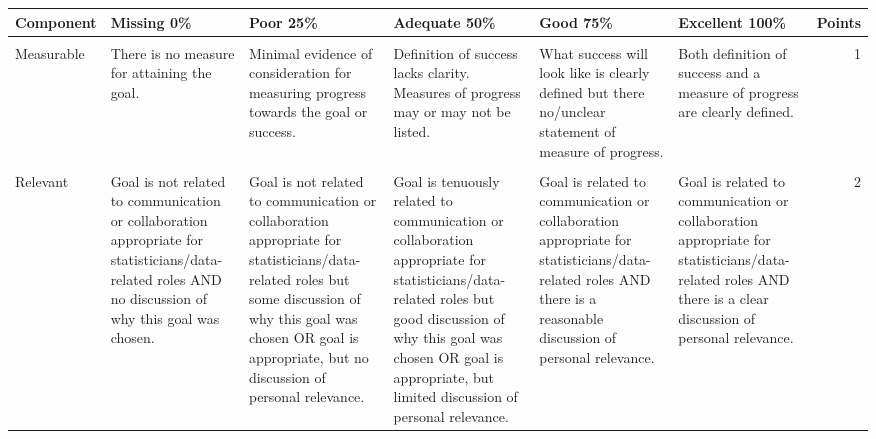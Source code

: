 \documentclass[
  openany]{book}
\begin{document}
\begin{table}
\centering\begingroup\fontsize{8}{10}\selectfont

\begin{tabular}{l>{\raggedright\arraybackslash}p{12em}>{\raggedright\arraybackslash}p{12em}>{\raggedright\arraybackslash}p{12em}>{\raggedright\arraybackslash}p{12em}>{\raggedright\arraybackslash}p{12em}r}
\toprule
Component & Missing 0\% & Poor 25\% & Adequate 50\% & Good 75\% & Excellent 100\% & Points\\
\midrule
\cellcolor{gray!6}{Specific} & \cellcolor{gray!6}{There is no goal stated.} & \cellcolor{gray!6}{Goal is too generic and poorly specified. } & \cellcolor{gray!6}{Goal is stated but it is not specific. At least one resource may or may not be listed.} & \cellcolor{gray!6}{Goal is specific but no/unclear resource is mentioned.} & \cellcolor{gray!6}{Goal is specific. At least one resource that will be used to help is mentioned.} & \cellcolor{gray!6}{1}\\
Measurable & There is no measure for attaining the goal. & Minimal evidence of consideration for measuring progress towards the goal or success. & Definition of success lacks clarity. Measures of progress may or may not be listed. & What success will look like is clearly defined but there no/unclear statement of measure of progress. & Both definition of success and a measure of progress are clearly defined. & 1\\
\cellcolor{gray!6}{Attainable} & \cellcolor{gray!6}{There is no explanation for how the goal is to be attained.} & \cellcolor{gray!6}{Inappropriate scope, not believable that the goal is attainable. } & \cellcolor{gray!6}{Some issues with the scope of the goal, may not be attainable. Understanding of the steps and potential problems very limited.} & \cellcolor{gray!6}{Goal has a mostly appropriate scope but may lack some clarity around steps to take and potential problems.} & \cellcolor{gray!6}{Goal has an appropriate scope, and a strong understanding of the steps to take and potential problems is shown.} & \cellcolor{gray!6}{1}\\
Relevant & Goal is not related to communication or collaboration appropriate for statisticians/data-related roles AND no discussion of why this goal was chosen. & Goal is not related to communication or collaboration appropriate for statisticians/data-related roles but some discussion of why this goal was chosen OR goal is appropriate, but no discussion of personal relevance. & Goal is tenuously related to communication or collaboration appropriate for statisticians/data-related roles but good discussion of why this goal was chosen OR goal is appropriate, but limited discussion of personal relevance. & Goal is related to communication or collaboration appropriate for statisticians/data-related roles AND there is a reasonable discussion of personal relevance. & Goal is related to communication or collaboration appropriate for statisticians/data-related roles AND there is a clear discussion of personal relevance. & 2\\

\end{tabular}
\end{table}
\end{document}
